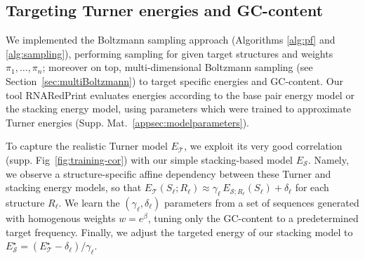 \documentclass{bioinfo}
\newcommand{\Nuc}[1]{{\sf #1}}
\newcommand{\Cb}{\Nuc{C}}
\newcommand{\Gb}{\Nuc{G}}
\newcommand{\GCb}{\Gb\Cb}
\newcommand{\Software}[1]{{\ttfamily #1}}
\newcommand{\ourprog}{\Software{RNARedPrint}}
\begin{document}
\subsection{Targeting Turner energies and GC-content}
We implemented the Boltzmann sampling approach (Algorithms
\ref{alg:pf} and \ref{alg:sampling}), performing sampling for given
target structures and weights $\pi_1,\dots,\pi_n$; moreover on top,
multi-dimensional Boltzmann sampling (see
Section~\ref{sec:multiBoltzmann}) to target specific energies and
\GCb-content.  Our tool \ourprog{} evaluates energies according to the base
pair energy model or the stacking energy model, using parameters which
were trained to approximate Turner energies
(Supp. Mat.~\ref{appsec:modelparameters}).
%
%

To capture the realistic Turner model $E_{\mathcal{T}}$, we exploit its very good correlation (supp. Fig~\ref{fig:training-cor}) with our simple stacking-based model $E_{\mathcal{S}}$. Namely, we observe a structure-specific affine dependency between these Turner and stacking energy models, so that $E_{\mathcal{T}}(S_\ell;R_\ell) \approx \gamma_\ell\, E_{\mathcal{S};R_\ell}(S_\ell) + \delta_\ell$ for each structure $R_\ell$. We learn the $(\gamma_\ell,\delta_\ell)$ parameters from a set of sequences generated with homogenous weights $w=e^{\beta}$, tuning only the \GCb-content to a predetermined target frequency.  Finally, we adjust the targeted energy of our stacking model to $E_{\mathcal{S}}^{\star} = (E_{\mathcal{T}}^{\star}- \delta_\ell)/\gamma_\ell$.
\end{document}
